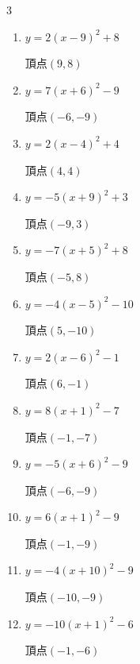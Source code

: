 \begin{multicols}{3}
\begin{enumerate}
  \item $\displaystyle y=2\left( x-9\right)^{2}+8$

        $\displaystyle 頂点\left( 9 , 8 \right)$

  \item $\displaystyle y=7\left( x+6\right)^{2}-9$

        $\displaystyle 頂点\left( -6 , -9 \right)$

  \item $\displaystyle y=2\left( x-4\right)^{2}+4$

        $\displaystyle 頂点\left( 4 , 4 \right)$

  \item $\displaystyle y=-5\left( x+9\right)^{2}+3$

        $\displaystyle 頂点\left( -9 , 3 \right)$

  \item $\displaystyle y=-7\left( x+5\right)^{2}+8$

        $\displaystyle 頂点\left( -5 , 8 \right)$

  \item $\displaystyle y=-4\left( x-5\right)^{2}-10$

        $\displaystyle 頂点\left( 5 , -10 \right)$

  \item $\displaystyle y=2\left( x-6\right)^{2}-1$

        $\displaystyle 頂点\left( 6 , -1 \right)$

  \item $\displaystyle y=8\left( x+1\right)^{2}-7$

        $\displaystyle 頂点\left( -1 , -7 \right)$

  \item $\displaystyle y=-5\left( x+6\right)^{2}-9$

        $\displaystyle 頂点\left( -6 , -9 \right)$

  \item $\displaystyle y=6\left( x+1\right)^{2}-9$

        $\displaystyle 頂点\left( -1 , -9 \right)$

  \item $\displaystyle y=-4\left( x+10\right)^{2}-9$

        $\displaystyle 頂点\left( -10 , -9 \right)$

  \item $\displaystyle y=-10\left( x+1\right)^{2}-6$

        $\displaystyle 頂点\left( -1 , -6 \right)$


\end{enumerate}
\end{multicols}
